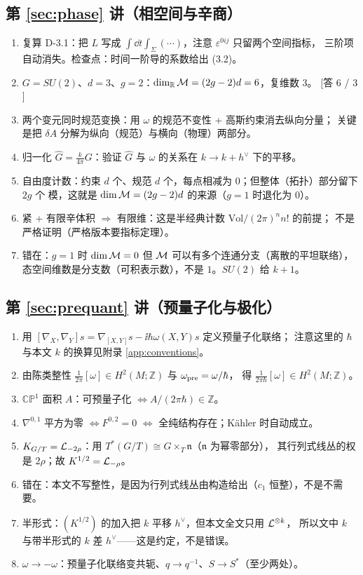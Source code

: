 \subsection*{第 \ref{sec:phase} 讲（相空间与辛商）}
\begin{enumerate}[leftmargin=*]
  \item 复算 D-3.1：把 $L$ 写成 $\int\dd t\int_\Sigma(\cdots)$，注意 $\varepsilon^{0ij}$ 只留两个空间指标，
        三阶项自动消失。检查点：时间一阶导的系数给出 (3.2)。
  \item $G=SU(2)$、$d=3$、$g=2$：$\dim_{\mathbb R}\mathcal{M}=(2g-2)d=6$，复维数 $3$。
        \hfill[答 $6$ / $3$]
  \item 两个变元同时规范变换：用 $\omega$ 的规范不变性 + 高斯约束消去纵向分量；
        关键是把 $\delta A$ 分解为纵向（规范）与横向（物理）两部分。
  \item 归一化 $\hat G=\frac{k}{4\pi}G$：验证 $\hat G$ 与 $\omega$ 的关系在 $k\to k+h^\vee$ 下的平移。
  \item 自由度计数：约束 $d$ 个、规范 $d$ 个，每点相减为 $0$；但整体（拓扑）部分留下 $2g$ 个
        模，这就是 $\dim\mathcal{M}=(2g-2)d$ 的来源（$g=1$ 时退化为 $0$）。
  \item 紧 + 有限辛体积 $\Rightarrow$ 有限维：这是半经典计数 $\mathrm{Vol}/(2\pi)^n n!$ 的前提；
        不是严格证明（严格版本要指标定理）。
  \item 错在：$g=1$ 时 $\dim\mathcal{M}=0$ 但 $\mathcal{M}$ 可以有多个连通分支（离散的平坦联络），
        态空间维数是分支数（可积表示数），不是 $1$。$SU(2)$ 给 $k+1$。
\end{enumerate}

\subsection*{第 \ref{sec:prequant} 讲（预量子化与极化）}
\begin{enumerate}[leftmargin=*]
  \item 用 $[\nabla_X,\nabla_Y]s=\nabla_{[X,Y]}s-\ii\hbar\omega(X,Y)s$ 定义预量子化联络；
        注意这里的 $\hbar$ 与本文 $k$ 的换算见附录 \ref{app:conventions}。
  \item 由陈类整性 $\frac{1}{2\pi}[\omega]\in H^2(M;\mathbb Z)$ 与 $\omega_{\rm pre}=\omega/\hbar$，
        得 $\frac{1}{2\pi\hbar}[\omega]\in H^2(M;\mathbb Z)$。\ours
  \item $\mathbb{CP}^1$ 面积 $A$：可预量子化 $\iff A/(2\pi\hbar)\in\mathbb Z$。
  \item $\nabla^{0,1}$ 平方为零 $\iff F^{0,2}=0$ $\iff$ 全纯结构存在；Kähler 时自动成立。
  \item $K_{G/T}=\mathcal{L}_{-2\rho}$：用 $T^*(G/T)\cong G\times_T\mathfrak n$（$\mathfrak n$ 为幂零部分），
        其行列式线丛的权是 $2\rho$；故 $K^{1/2}=\mathcal{L}_{-\rho}$。
  \item 错在：本文不写整性，是因为行列式线丛由构造给出（$c_1$ 恒整），不是不需要。
  \item 半形式：$(K^{1/2})$ 的加入把 $k$ 平移 $h^\vee$，但本文全文只用 $\mathcal{L}^{\otimes k}$，
        所以文中 $k$ 与带半形式的 $k$ 差 $h^\vee$——这是约定，不是错误。
  \item $\omega\to-\omega$：预量子化联络变共轭、$q\to q^{-1}$、$S\to S^*$（至少两处）。
\end{enumerate}

